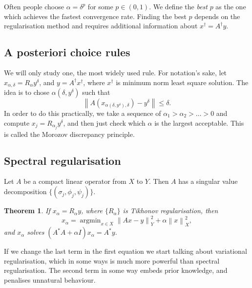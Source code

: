 \documentclass[12pt]{article}
\newtheorem{theorem}{Theorem}[section]
\theoremstyle{definition}
\DeclareMathOperator{\argmin}{argmin}
\newcommand\norm[1]{\left\lVert#1\right\rVert}
\begin{document}
Often people choose $\alpha = \delta^p$ for some $p\in(0,1)$. We define the \textit{best} $p$ as the one which achieves the fastest convergence rate. Finding the best $p$ depends on the regularisation method and requires additional information about $x^\dagger =A^\dagger y$.

\subsection{A posteriori choice rules}
We will only study one, the most widely used rule. For notation's sake, let $x_{\alpha,\delta} = R_\alpha y^\delta$, and $y= A^\dagger x^\dagger $, where $x^\dagger $ is minimum norm least square solution. The idea is to chose $\alpha(\delta,y^\delta)$ such that 
\begin{equation*}
    \norm{A(x_{\alpha(\delta,y^\delta),\delta}) -y^\delta } \leq \delta.
\end{equation*}
In order to do this practically, we take a sequence of $\alpha_1>\alpha_2>\dots>0$ and compute $x_j=R_{\alpha_j} y^\delta$, and then just check which $\alpha$ is the largest acceptable. This is called the Morozov discrepancy principle.

\subsection{Spectral regularisation}
Let $A$ be a compact linear operator from $X$ to $Y$. Then $A$ has a singular value decomposition $\{(\sigma_j,\phi_j,\psi_j)\}$.

\begin{theorem}
    If $x_\alpha = R_\alpha y$, where $\{R_\alpha\}$ is Tikhonov regularisation, then 
    \begin{equation*}
        x_\alpha = \argmin_{x\in X} \norm{Ax-y}_Y^2+\alpha\norm{x}_X^2,
    \end{equation*}
    and $x_\alpha$ solves $(A^*A+\alpha I)x_\alpha = A^* y$. 
\end{theorem}
If we change the last term in the first equation we start talking about variational regularisation, which in some ways is much more powerful than spectral regularisation. The second term in some way embeds prior knowledge, and penalises unnatural behaviour.

\newpage
\end{document}
